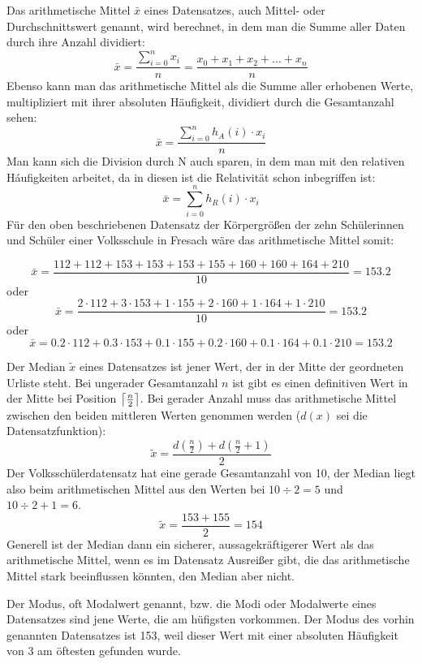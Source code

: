 Das arithmetische Mittel $\bar{x}$ eines Datensatzes, auch Mittel- oder Durchschnittswert genannt, wird berechnet, in dem man die Summe aller Daten durch ihre Anzahl dividiert: $$\bar{x} = \frac{\sum_{i=0}^{n} x_i}{n} = \frac{x_{0} + x_{1} + x_{2} + ... + x_{n}}{n}$$ Ebenso kann man das arithmetische Mittel als die Summe aller erhobenen Werte, multipliziert mit ihrer absoluten H\"{a}ufigkeit, dividiert durch die Gesamtanzahl sehen: $$\bar{x} = \frac{\sum_{i=0}^{n} h_{A}(i) \cdot x_{i}}{n}$$ Man kann sich die Division durch N auch sparen, in dem man mit den relativen H\'{a}ufigkeiten arbeitet, da in diesen ist die Relativit\"{a}t schon inbegriffen ist: $$\bar{x} = \sum_{i=0}^{n} h_{R}(i) \cdot x_{i}$$ F\"{u}r den oben beschriebenen Datensatz der K\"{o}rpergr\"{o}\ss{}en der zehn Sch\"{u}lerinnen und Sch\"{u}ler einer Volksschule in Fresach w\"{a}re das arithmetische Mittel somit: 

$$\bar{x} = \frac{112 + 112 + 153 + 153 + 153 + 155 + 160 + 160 + 164 + 210}{10} = 153.2$$ oder $$\bar{x} = \frac{2 \cdot 112 + 3 \cdot 153 + 1 \cdot 155 + 2 \cdot 160 + 1 \cdot 164 + 1 \cdot 210}{10} = 153.2$$ oder $$\bar{x} = 0.2 \cdot 112 + 0.3 \cdot 153 + 0.1 \cdot 155 + 0.2 \cdot 160 + 0.1 \cdot 164 + 0.1 \cdot 210 = 153.2$$


Der Median $\tilde{x}$ eines Datensatzes ist jener Wert, der in der Mitte der geordneten Urliste steht. Bei ungerader Gesamtanzahl $n$ ist gibt es einen definitiven Wert in der Mitte bei Position $\left\lceil \frac{n}{2} \right\rceil$. Bei gerader Anzahl muss das arithmetische Mittel zwischen den beiden mittleren Werten genommen werden ($d(x)$ sei die Datensatzfunktion): $$\tilde{x} = \frac{d(\frac{n}{2}) + d(\frac{n}{2} + 1)}{2}$$ Der Volkssch\"{u}lerdatensatz hat eine gerade Gesamtanzahl von 10, der Median liegt also beim arithmetischen Mittel aus den Werten bei $10 \div 2 = 5$ und $10 \div 2 + 1 = 6$. $$\tilde{x} = \frac{153 + 155}{2} = 154$$ Generell ist der Median dann ein sicherer, aussagekr\"{a}ftigerer Wert als das arithmetische Mittel, wenn es im Datensatz Ausrei\ss{}er gibt, die das arithmetische Mittel stark beeinflussen k\"{o}nnten, den Median aber nicht.

\pagebreak


Der Modus, oft Modalwert genannt, bzw. die Modi oder Modalwerte eines Datensatzes sind jene Werte, die am h\"{u}figsten vorkommen. Der Modus des vorhin genannten Datensatzes ist 153, weil dieser Wert mit einer absoluten H\"{a}ufigkeit von 3 am \"{o}ftesten gefunden wurde.


